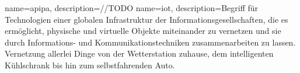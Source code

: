 


{
  name={\acrlong{apipa}},
  description={//TODO}
}
{
  name={\acrlong{iot}},
  description={Begriff für Technologien einer globalen Infrastruktur der Informationsgesellschaften, die es ermöglicht, physische und virtuelle Objekte miteinander zu vernetzen und sie durch Informations- und Kommunikationstechniken zusammenarbeiten zu lassen. Vernetzung allerlei Dinge von der Wetterstation zuhause, dem intelligenten Kühlschrank bis hin zum selbstfahrenden Auto.}
}